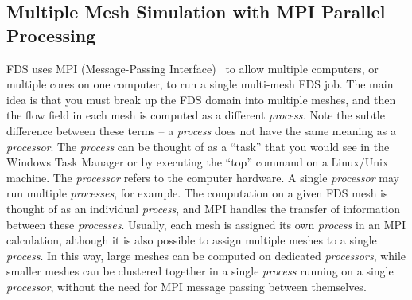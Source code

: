 \documentclass[11pt]{book}
\begin{document}
\subsection{Multiple Mesh Simulation with MPI Parallel Processing}
\label{info:parallelprocessing}

FDS uses MPI (Message-Passing Interface)~\cite{Gropp:1} to allow multiple computers, or multiple cores on one computer, to run a single multi-mesh FDS job. The main idea is that you must break up the FDS domain into multiple meshes, and then the flow field in each mesh is computed as a different {\em process.} Note the subtle difference between these terms -- a {\em process} does not have the same meaning as a {\em processor}. The {\em process} can be thought of as a ``task'' that you would see in
the Windows Task Manager or by executing the ``top'' command on a Linux/Unix machine. The {\em processor} refers to the computer hardware. A single {\em processor} may run multiple {\em processes}, for example. The computation on a given FDS mesh is thought of as an individual {\em process}, and MPI handles the transfer of information between these {\em processes}. Usually, each mesh is assigned its own {\em process} in an MPI calculation, although it is also possible to assign multiple meshes to a single {\em process}. In this way, large meshes can be computed on dedicated {\em processors}, while smaller meshes can be clustered together in a single {\em process} running on a single {\em processor}, without the need for MPI message passing between themselves.
\end{document}

